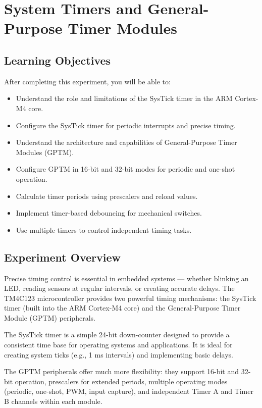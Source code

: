 \chapter{System Timers and General-Purpose Timer Modules}

\section*{Learning Objectives}
After completing this experiment, you will be able to:
\begin{itemize}[nosep]
  \item Understand the role and limitations of the SysTick timer in the ARM Cortex-M4 core.
  \item Configure the SysTick timer for periodic interrupts and precise timing.
  \item Understand the architecture and capabilities of General-Purpose Timer Modules (GPTM).
  \item Configure GPTM in 16-bit and 32-bit modes for periodic and one-shot operation.
  \item Calculate timer periods using prescalers and reload values.
  \item Implement timer-based debouncing for mechanical switches.
  \item Use multiple timers to control independent timing tasks.
\end{itemize}

\section*{Experiment Overview}
Precise timing control is essential in embedded systems — whether blinking an LED, reading sensors at regular intervals, or creating accurate delays. The TM4C123 microcontroller provides two powerful timing mechanisms: the SysTick timer (built into the ARM Cortex-M4 core) and the General-Purpose Timer Module (GPTM) peripherals.

\noindent The SysTick timer is a simple 24-bit down-counter designed to provide a consistent time base for operating systems and applications. It is ideal for creating system ticks (e.g., 1 ms intervals) and implementing basic delays.

\noindent The GPTM peripherals offer much more flexibility: they support 16-bit and 32-bit operation, prescalers for extended periods, multiple operating modes (periodic, one-shot, PWM, input capture), and independent Timer A and Timer B channels within each module.

